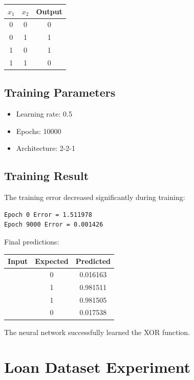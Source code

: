 \documentclass[a4paper,12pt]{article}
\begin{document}
\begin{center}
\begin{tabular}{ccc}
\toprule
$x_1$ & $x_2$ & Output \\
\midrule
0 & 0 & 0 \\
0 & 1 & 1 \\
1 & 0 & 1 \\
1 & 1 & 0 \\
\bottomrule
\end{tabular}
\end{center}

\subsection{Training Parameters}

\begin{itemize}
    \item Learning rate: 0.5
    \item Epochs: 10000
    \item Architecture: 2-2-1
\end{itemize}

\subsection{Training Result}

The training error decreased significantly during training:

\begin{verbatim}
Epoch 0 Error = 1.511978
Epoch 9000 Error = 0.001426
\end{verbatim}

Final predictions:

\begin{center}
\begin{tabular}{ccc}
\toprule
Input & Expected & Predicted \\
\midrule
[0,0] & 0 & 0.016163 \\
[0,1] & 1 & 0.981511 \\
[1,0] & 1 & 0.981505 \\
[1,1] & 0 & 0.017538 \\
\bottomrule
\end{tabular}
\end{center}

The neural network successfully learned the XOR function.

\section{Loan Dataset Experiment}
\end{document}
